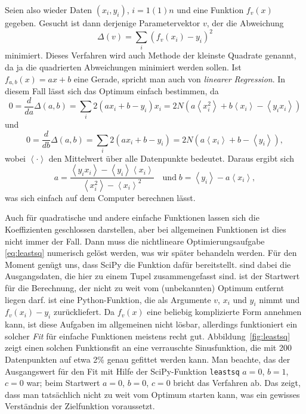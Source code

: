 Seien also wieder Daten $(x_i, y_i)$, $i=1(1)n$ und eine Funktion
$f_v(x)$ gegeben. Gesucht ist dann derjenige Parametervektor $v$, der
die Abweichung
\begin{equation}
  \label{eq:leastsq}
  \Delta(v) = \sum_i (f_v(x_i) - y_i)^2
\end{equation}
minimiert. Dieses Verfahren wird auch Methode der kleinste Quadrate
genannt, da ja die quadrierten Abweichungen minimiert werden
sollen. Ist $f_{a,b}(x) = ax + b$ eine Gerade, spricht man auch von
\emph{linearer Regression}. In diesem Fall lässt
sich das Optimum einfach bestimmen, da
\begin{equation}
  0 = \frac{d}{da} \Delta(a,b) = \sum_i 2 (a x_i + b - y_i)x_i
  = 2N \left(a  \left<x_i^2\right> + b \left<x_i\right> -
    \left<y_ix_i\right> \right)
\end{equation}
und
\begin{equation}
  0 = \frac{d}{db} \Delta(a,b) = \sum_i 2 (a x_i + b - y_i)
  = 2N \left(a  \left<x_i\right> + b - \left<y_i\right> \right),
\end{equation}
wobei $\left<\cdot\right>$ den Mittelwert über alle Datenpunkte
bedeutet. Daraus ergibt sich
\begin{equation}
  a = \frac{\left<y_ix_i\right> -
    \left<y_i\right>\left<x_i\right>}{\left<x_i^2\right>-\left<x_i\right>^2}
  \quad\text{und}\;
  b = \left<y_i\right> - a \left<x_i\right>,
\end{equation}
was sich einfach auf dem Computer berechnen lässt.

Auch für quadratische und andere einfache Funktionen lassen sich die
Koeffizienten geschlossen darstellen, aber bei allgemeinen Funktionen
ist dies nicht immer der Fall. Dann muss die nichtlineare
Optimierungsaufgabe \eqref{eq:leastsq} numerisch gelöst werden, was
wir später behandeln werden. Für den Moment genügt uns, dass SciPy die
Funktion  dafür
bereitstellt.  sind dabei die Ausgangsdaten, die hier zu
einem Tupel zusammengefasst sind.  ist der Startwert für die
Berechnung, der nicht zu weit vom (unbekannten) Optimum entfernt
liegen darf.  ist eine Python-Funktion, die als Argumente
$v$, $x_i$ und $y_i$ nimmt und $f_v(x_i) - y_i$ zurückliefert.  Da
$f_v(x)$ eine beliebig komplizierte Form annehmen kann, ist diese
Aufgaben im allgemeinen nicht lösbar, allerdings funktioniert ein
solcher \emph{Fit} für einfache Funktionen meistens recht
gut. Abbildung~\ref{fig:leastsq} zeigt einen solchen Funktionsfit an
eine verrauschte Sinusfunktion, die mit 200 Datenpunkten auf etwa 2\%
genau gefittet werden kann. Man beachte, das der Ausgangswert für den
Fit mit Hilfe der SciPy-Funktion \lstinline!leastsq! $a=0$, $b=1$,
$c=0$ war; beim Startwert $a=0$, $b=0$, $c=0$ bricht das Verfahren
ab. Das zeigt, dass man tatsächlich nicht zu weit vom Optimum starten
kann, was ein gewisses Verständnis der Zielfunktion voraussetzt.

